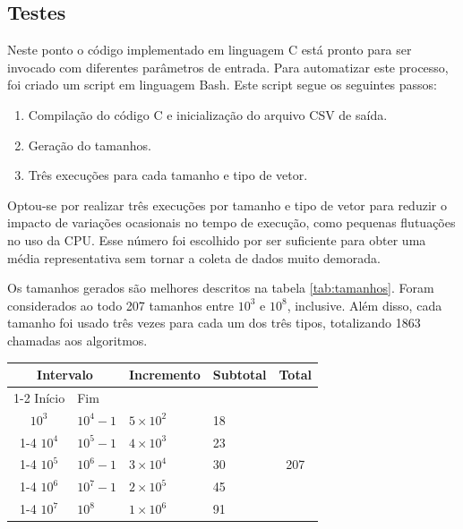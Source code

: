 \subsection{Testes}\label{subsection:Testes}
Neste ponto o código implementado em linguagem C está pronto para ser invocado com diferentes parâmetros de entrada. Para automatizar este processo, foi criado um script em linguagem Bash. Este script segue os seguintes passos:
\begin{enumerate}
    \item Compilação do código C e inicialização do arquivo CSV de saída.
    
    \item Geração do tamanhos.
    
    \item Três execuções para cada tamanho e tipo de vetor.
    
\end{enumerate}

Optou-se por realizar três execuções por tamanho e tipo de vetor para reduzir o impacto de variações ocasionais no tempo de execução, como pequenas flutuações no uso da CPU. Esse número foi escolhido por ser suficiente para obter uma média representativa sem tornar a coleta de dados muito demorada.

Os tamanhos gerados são melhores descritos na tabela \ref{tab:tamanhos}. Foram considerados ao todo 207 tamanhos entre $10^3$ e $10^8$, inclusive. Além disso, cada tamanho foi usado três vezes para cada um dos três tipos, totalizando 1863 chamadas aos algoritmos.
\begin{table}[H]
    \centering
    \begin{tabular}{ c | l | l | l | c }
        \hline
        \multicolumn{2}{c|}{Intervalo} & \multirow{2}{*}{Incremento} & \multirow{2}{*}{Subtotal} & \multirow{2}{*}{Total}\\
        \cline{1-2}
        Início     & Fim        &                 &    & \\
        \hline
        $10^3$     & $10^4 - 1$ & $5 \times 10^2$ & 18 & \multirow{5}{*}{207} \\
        \cline{1-4}
        $10^4$     & $10^5 - 1$ & $4 \times 10^3$ & 23 & \\
        \cline{1-4}
        $10^5$     & $10^6 - 1$ & $3 \times 10^4$ & 30 & \\
        \cline{1-4}
        $10^6$     & $10^7 - 1$ & $2 \times 10^5$ & 45 & \\
        \cline{1-4}
        $10^7$     & $10^8$     & $1 \times 10^6$ & 91 & \\
        \hline
    \end{tabular}
\end{table}